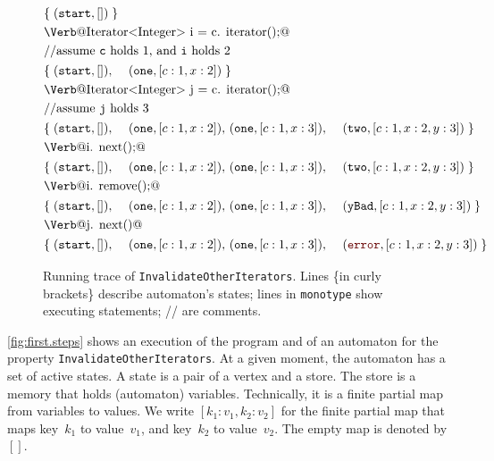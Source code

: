 \documentclass{sigplanconf}[10pt] %
\newcommand{\error}{\ensuremath{\textcolor{darkred}{\mathtt{error}}}\xspace}
\newcommand{\start}{\ensuremath{\mathtt{start}}\xspace}
\newtheorem{notation}{Notation}
\begin{document}
\begin{figure}[t]
{\def\s#1{\text{\Verb@#1@}}
 \def\m#1{\PY{n+na}{#1}}
 \def\t#1{\mathtt{#1}}
\begin{align*}
&\{\;(\start,[])\;\} \\
&\s{Iterator<Integer> i = c.\m{iterator}();}  \\
&\text{//assume {\tt c} holds $1$, and {\tt i} holds $2$ } \\
& \begin{aligned}
  \{\;&(\start,[]),\
      &(\t{one},[c:1,x:2])\;\}
  \end{aligned}\\
&\s{Iterator<Integer> j = c.\m{iterator}();}  \\
&\text{//assume {\tt j} holds $3$} \\
& \begin{aligned}
  \{\;&(\start,[]),\
      &(\t{one},[c:1,x:2]),\
      &(\t{one},[c:1,x:3]),\
      &(\t{two},[c:1,x:2,y:3])\;\}
  \end{aligned}\\
&\s{i.\m{next}();} \\
& \begin{aligned}
  \{\;&(\start,[]),\
      &(\t{one},[c:1,x:2]),\
      &(\t{one},[c:1,x:3]),\
      &(\t{two},[c:1,x:2,y:3])\;\}
  \end{aligned}\\
&\s{i.\m{remove}();} \\
& \begin{aligned}
  \{\;&(\start,[]),\
      &(\t{one},[c:1,x:2]),\
      &(\t{one},[c:1,x:3]),\
      &(\t{yBad},[c:1,x:2,y:3])\;\}
  \end{aligned}\\
&\s{j.\m{next}()} \\
& \begin{aligned}
  \{\;&(\start,[]),\
      &(\t{one},[c:1,x:2]),\
      &(\t{one},[c:1,x:3]),\
      &(\error,[c:1,x:2,y:3])\;\}
  \end{aligned}\\
\end{align*}}
\caption{Running trace of {\tt InvalidateOtherIterators}. Lines \{in curly brackets\} describe automaton's states;
lines in \texttt{monotype} show executing statements;
// are comments.}
\label{fig:first.steps}
\end{figure} %
\autoref{fig:first.steps} shows an execution of the program and of an automaton for the property \texttt{InvalidateOtherIterators}.
At a given moment, the automaton has a set of active states.
A state is a pair of a vertex and a store.
The store is a memory that holds (automaton) variables.
Technically, it is a finite partial map from variables to values.
%
We write $[k_1:v_1,k_2:v_2]$ for the finite partial map that maps key~$k_1$ to value~$v_1$, and key~$k_2$ to value~$v_2$.
The empty map is denoted by~$[]$.
\end{document}
